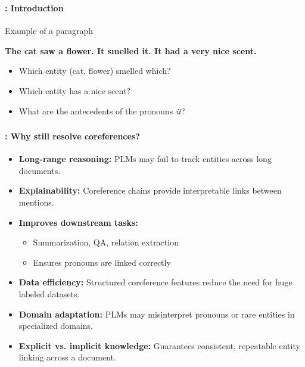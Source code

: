 \documentclass[xcolor=table]{beamer}
\subtitle[09- Coreference resolution]{Chapter 09\\Coreference resolution}
\begin{document}
	
\begin{frame}
	\frametitle{\inserttitle}
	\framesubtitle{\insertshortsubtitle: Introduction}

	\begin{exampleblock}{Example of a paragraph}
		\begin{center}
			\Large\bfseries
		The cat saw a flower. \textbf{\color{red}It} smelled \textbf{\color{red}it}. \textbf{\color{red}It} had a very nice scent.
		\end{center}
	\end{exampleblock}
	
	\begin{itemize}
		\item Which entity (cat, flower) smelled which?
		\item Which entity has a nice scent?
		\item What are the antecedents of the pronouns \textit{it}?
	\end{itemize}

\end{frame}

\begin{frame}
	\frametitle{\inserttitle}
	\framesubtitle{\insertshortsubtitle: Why still resolve coreferences?}
	
	\begin{itemize}
		\item \textbf{Long-range reasoning:} PLMs may fail to track entities across long documents.
		\item \textbf{Explainability:} Coreference chains provide interpretable links between mentions.
		\item \textbf{Improves downstream tasks:} 
		\begin{itemize}
			\item Summarization, QA, relation extraction
			\item Ensures pronouns are linked correctly
		\end{itemize}
		\item \textbf{Data efficiency:} Structured coreference features reduce the need for huge labeled datasets.
		\item \textbf{Domain adaptation:} PLMs may misinterpret pronouns or rare entities in specialized domains.
		\item \textbf{Explicit vs. implicit knowledge:} Guarantees consistent, repeatable entity linking across a document.
	\end{itemize}
	
\end{frame}
\end{document}
